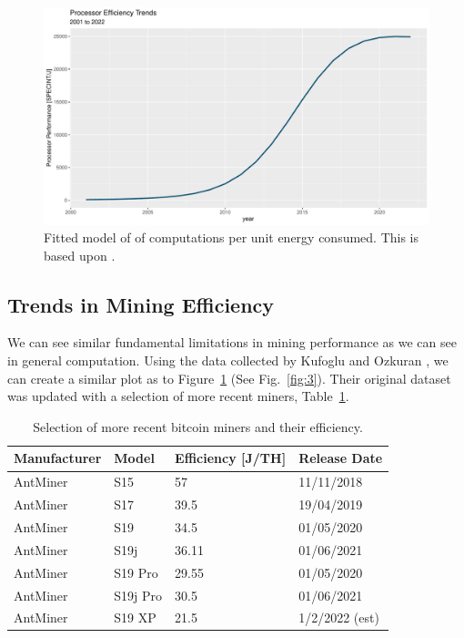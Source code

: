 \documentclass[runningheads]{llncs}
\begin{document}
\begin{figure}
    \includegraphics[width=\textwidth]{Processor Forecast.pdf}
    \caption{Fitted model of of computations per unit energy consumed. This is based upon \cite{rupp2020trends}.} \label{fig:2}
\end{figure}

\subsection{Trends in Mining Efficiency}

We can see similar fundamental limitations in mining performance as we can see in general computation.
Using the data collected by Kufoglu and Ozkuran \cite{kuf2019mining}, we can create a similar plot as to Figure~\ref{fig:2} (See Fig.~\ref{fig:3}).
Their original dataset was updated with a selection of more recent miners, Table~\ref{tbl:1}.

\begin{table}
    \caption{Selection of more recent bitcoin miners and their efficiency.}\label{tbl:1}
    \begin{tabular}{|l|l|l|l|}
        \hline
        Manufacturer & Model    & Efficiency [J/TH] & Release Date   \\
        \hline
        AntMiner     & S15      & 57                & 11/11/2018     \\
        AntMiner     & S17      & 39.5              & 19/04/2019     \\
        AntMiner     & S19      & 34.5              & 01/05/2020     \\
        AntMiner     & S19j     & 36.11             & 01/06/2021     \\
        AntMiner     & S19 Pro  & 29.55             & 01/05/2020     \\
        AntMiner     & S19j Pro & 30.5              & 01/06/2021     \\
        AntMiner     & S19 XP   & 21.5              & 1/2/2022 (est) \\
        \hline
    \end{tabular}
\end{table}
\end{document}
